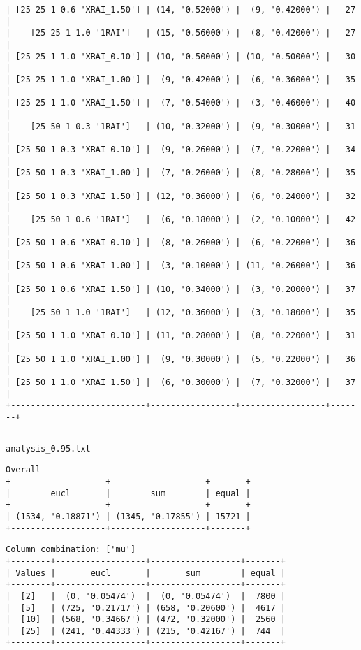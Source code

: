 \documentclass{article}
\begin{document}
\begin{verbatim}
| [25 25 1 0.6 'XRAI_1.50'] | (14, '0.52000') |  (9, '0.42000') |   27  |
|    [25 25 1 1.0 '1RAI']   | (15, '0.56000') |  (8, '0.42000') |   27  |
| [25 25 1 1.0 'XRAI_0.10'] | (10, '0.50000') | (10, '0.50000') |   30  |
| [25 25 1 1.0 'XRAI_1.00'] |  (9, '0.42000') |  (6, '0.36000') |   35  |
| [25 25 1 1.0 'XRAI_1.50'] |  (7, '0.54000') |  (3, '0.46000') |   40  |
|    [25 50 1 0.3 '1RAI']   | (10, '0.32000') |  (9, '0.30000') |   31  |
| [25 50 1 0.3 'XRAI_0.10'] |  (9, '0.26000') |  (7, '0.22000') |   34  |
| [25 50 1 0.3 'XRAI_1.00'] |  (7, '0.26000') |  (8, '0.28000') |   35  |
| [25 50 1 0.3 'XRAI_1.50'] | (12, '0.36000') |  (6, '0.24000') |   32  |
|    [25 50 1 0.6 '1RAI']   |  (6, '0.18000') |  (2, '0.10000') |   42  |
| [25 50 1 0.6 'XRAI_0.10'] |  (8, '0.26000') |  (6, '0.22000') |   36  |
| [25 50 1 0.6 'XRAI_1.00'] |  (3, '0.10000') | (11, '0.26000') |   36  |
| [25 50 1 0.6 'XRAI_1.50'] | (10, '0.34000') |  (3, '0.20000') |   37  |
|    [25 50 1 1.0 '1RAI']   | (12, '0.36000') |  (3, '0.18000') |   35  |
| [25 50 1 1.0 'XRAI_0.10'] | (11, '0.28000') |  (8, '0.22000') |   31  |
| [25 50 1 1.0 'XRAI_1.00'] |  (9, '0.30000') |  (5, '0.22000') |   36  |
| [25 50 1 1.0 'XRAI_1.50'] |  (6, '0.30000') |  (7, '0.32000') |   37  |
+---------------------------+-----------------+-----------------+-------+
\end{verbatim}

\begin{verbatim}

\end{verbatim}

\newpage
\verb|analysis_0.95.txt|
\begin{verbatim}
Overall
+-------------------+-------------------+-------+
|        eucl       |        sum        | equal |
+-------------------+-------------------+-------+
| (1534, '0.18871') | (1345, '0.17855') | 15721 |
+-------------------+-------------------+-------+
\end{verbatim}

\begin{verbatim}
Column combination: ['mu']
+--------+------------------+------------------+-------+
| Values |       eucl       |       sum        | equal |
+--------+------------------+------------------+-------+
|  [2]   |  (0, '0.05474')  |  (0, '0.05474')  |  7800 |
|  [5]   | (725, '0.21717') | (658, '0.20600') |  4617 |
|  [10]  | (568, '0.34667') | (472, '0.32000') |  2560 |
|  [25]  | (241, '0.44333') | (215, '0.42167') |  744  |
+--------+------------------+------------------+-------+
\end{verbatim}
\end{document}
